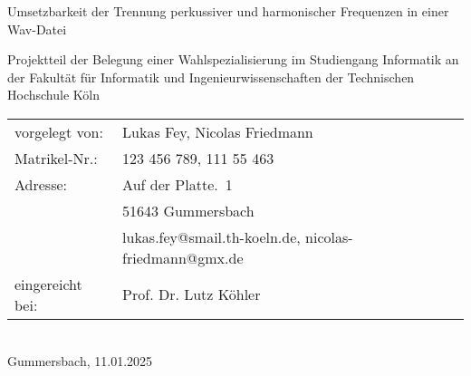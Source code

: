 \begin{titlepage}
%
\sffamily%
%
\begin{center}
\end{center}
%
\vfill
%
\begin{huge}
Umsetzbarkeit der Trennung perkussiver und harmonischer Frequenzen in einer Wav-Datei\\[10mm]
\end{huge}
%
Projektteil der Belegung einer Wahlspezialisierung\newline
im Studiengang Informatik\newline
an der Fakultät für Informatik und Ingenieurwissenschaften\newline
der Technischen Hochschule Köln
%
\vfill
%
\begin{tabular}{@{}ll}
vorgelegt von: & Lukas Fey, Nicolas Friedmann\\
Matrikel-Nr.:  & 123 456 789, 111 55 463\\
Adresse:       & Auf der Platte.~1\\
               & 51643 Gummersbach\\
               & lukas.fey@smail.th-koeln.de, nicolas-friedmann@gmx.de\\[5mm]
eingereicht bei:   & Prof. Dr. Lutz Köhler\\
\end{tabular}	
%
\\[10mm]
%
Gummersbach, 11.01.2025%
%
\rmfamily%
%
\end{titlepage}